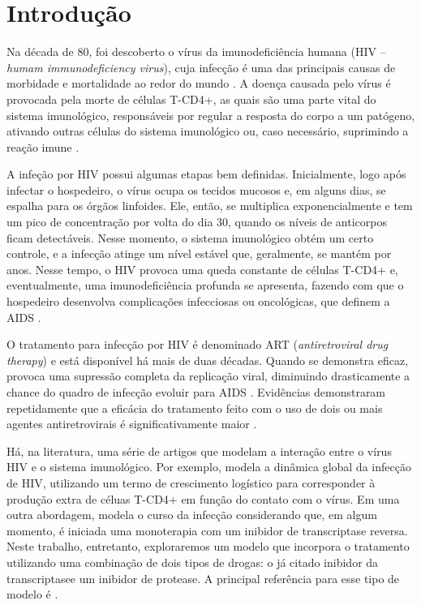 \section{Introdução}





Na década de 80, foi descoberto o vírus da imunodeficiência humana (HIV -- \textit{humam immunodeficiency virus}), cuja infecção é uma das principais causas de morbidade e mortalidade ao redor do mundo \cite{nature}.
A doença causada pelo vírus é provocada pela morte de células T-CD4+, as quais são uma parte vital do sistema imunológico, responsáveis por regular a resposta do corpo a um patógeno, ativando outras células do sistema imunológico ou, caso necessário, suprimindo a reação imune \cite{tcd4+}.

A infeção por HIV possui algumas etapas bem definidas.
Inicialmente, logo após infectar o hospedeiro, o vírus ocupa os tecidos mucosos e, em alguns dias, se espalha para os órgãos linfoides.
Ele, então, se multiplica exponencialmente e tem um pico de concentração por volta do dia 30, quando os níveis de anticorpos ficam detectáveis.
Nesse momento, o sistema imunológico obtém um certo controle, e a infecção atinge um nível estável que, geralmente, se mantém por anos.
Nesse tempo, o HIV provoca uma queda constante de células T-CD4+ e, eventualmente, uma imunodeficiência profunda se apresenta, fazendo com que o hospedeiro desenvolva complicações infecciosas ou oncológicas, que definem a AIDS \cite{nature}.

O tratamento para infecção por HIV é denominado ART (\textit{antiretroviral drug therapy}) e está disponível há mais de duas décadas.
Quando se demonstra eficaz, provoca uma supressão completa da replicação viral, diminuindo drasticamente a chance do quadro de infecção evoluir para AIDS \cite{nature}.
Evidências demonstraram repetidamente que a eficácia do tratamento feito com o uso de dois ou mais agentes antiretrovirais é significativamente maior \cite{comb-drug}.

Há, na literatura, uma série de artigos que modelam a interação entre o vírus HIV e o sistema imunológico.
Por exemplo, \cite{model-simple} modela a dinâmica global da infecção de HIV, utilizando um termo de crescimento logístico para corresponder à produção extra de céluas T-CD4+ em função do contato com o vírus.
Em uma outra abordagem, \cite{model-treatment} modela o curso da infecção considerando que, em algum momento, é iniciada uma monoterapia com um inibidor de transcriptase reversa.
Neste trabalho, entretanto, exploraremos um modelo que incorpora o tratamento utilizando uma combinação de dois tipos de drogas: o já citado inibidor da transcriptasee um inibidor de protease.
A principal referência para esse tipo de modelo é \cite{model-combined}.


